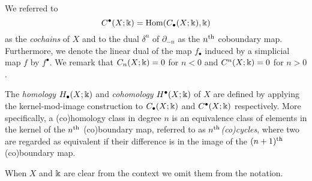 We referred to
\begin{equation*}
C^\bullet(X; \Bbbk) = \mathrm{Hom}(C_\bullet(X; \Bbbk), \Bbbk)
\end{equation*}
as the \textit{cochains} of $X$ and to the dual $\delta^{n}$ of $\partial_{-n}$ as the $n^\mathrm{th}$ coboundary map.
Furthermore, we denote the linear dual of the map $f_\bullet$ induced by a simplicial map $f$ by $f^\bullet$.
We remark that $C_n(X; \Bbbk) = 0$ for $n < 0$ and $C^n(X;\Bbbk) = 0$ for $n > 0$.

The \textit{homology} $H_\bullet(X; \Bbbk)$ and \textit{cohomology} $H^\bullet(X; \Bbbk)$ of $X$ are defined by applying the kernel-mod-image construction to $C_\bullet(X; \Bbbk)$ and $C^\bullet(X; \Bbbk)$ respectively.
More specifically, a (co)homology class in degree $n$ is an equivalence class of elements in the kernel of the $n^\mathrm{th}$ (co)boundary map, referred to as  $n^\mathrm{th}$\textit{(co)cycles}, where two are regarded as equivalent if their difference is in the image of the $(n+1)^\mathrm{th}$ (co)boundary map.

When $X$ and $\Bbbk$ are clear from the context we omit them from the notation.